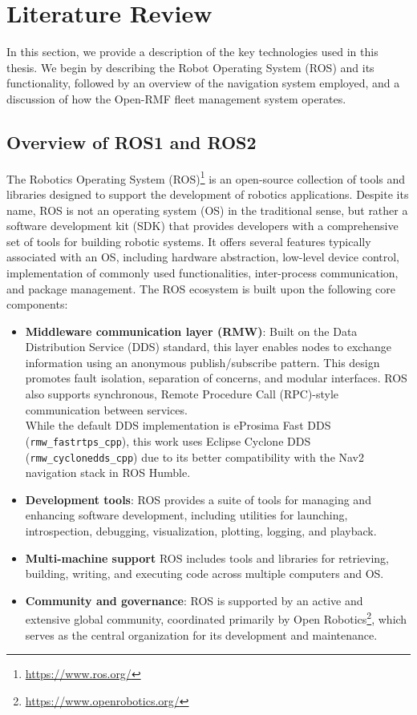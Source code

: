 \part{Literature Review}
In this section, we provide a description of the key technologies used in this thesis. We begin by describing the Robot Operating System (ROS) and its functionality, followed by an overview of the navigation system employed, and a discussion of how the Open-RMF fleet management system operates.
\chapter{Overview of ROS1 and ROS2}
The Robotics Operating System (ROS)\footnote{\href{https://www.ros.org/}{https://www.ros.org/}} is an open-source collection of tools and libraries designed to support the development of robotics applications. Despite its name, ROS is not an operating system (OS) in the traditional sense, but rather a software development kit (SDK) that provides developers with a comprehensive set of tools for building robotic systems. It offers several features typically associated with an OS, including hardware abstraction, low-level device control, implementation of commonly used functionalities, inter-process communication, and package management.
The ROS ecosystem is built upon the following core components:
\begin{itemize}
	\item \textbf{Middleware communication layer (RMW)}: Built on the Data Distribution Service (DDS) standard, this layer enables nodes to exchange information using an anonymous publish/subscribe pattern. This design promotes fault isolation, separation of concerns, and modular interfaces. ROS also supports synchronous, Remote Procedure Call (RPC)-style communication between services.\\While the default DDS implementation is eProsima Fast DDS  (\texttt{rmw\_fastrtps\_cpp}), this work uses Eclipse Cyclone DDS (\texttt{rmw\_cyclonedds\_cpp}) due to its better compatibility with the Nav2 navigation stack in ROS Humble.
	\item \textbf{Development tools}: ROS provides a suite of tools for managing and enhancing software development, including utilities for launching, introspection, debugging, visualization, plotting, logging, and playback.
	\item \textbf{Multi-machine support} ROS includes tools and libraries for retrieving, building, writing, and executing code across multiple computers and OS.
	\item \textbf{Community and governance}: ROS is supported by an active and extensive global community, coordinated primarily by Open Robotics\footnote{\href{https://www.openrobotics.org/}{https://www.openrobotics.org/}}, which serves as the central organization for its development and maintenance.
\end{itemize}
\newpage
